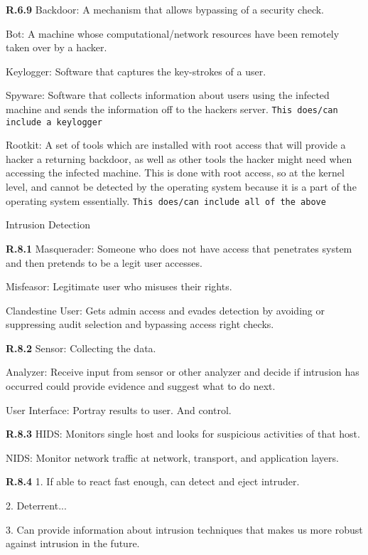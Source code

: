 \documentclass[8pt]{extreport}
\begin{document}
{\bf R.6.9} 
Backdoor: A mechanism that allows bypassing of a security check.

Bot: A machine whose computational/network resources have been remotely taken
over by a hacker.

Keylogger: Software that captures the key-strokes of a user. 

Spyware: Software that collects information about users using the infected
machine and sends the information off to the hackers server. \texttt{This
does/can include a keylogger}

Rootkit: A set of tools which are installed with root access that will provide a
hacker a returning backdoor, as well as other tools the hacker might need when
accessing the infected machine. This is done with root access, so at the kernel
level, and cannot be detected by the operating system because it is a part of
the operating system essentially. \texttt{This does/can include all of the above}



{\Huge Intrusion Detection}

{\bf R.8.1}
Masquerader: Someone who does not have access that penetrates system and then
pretends to be a legit user accesses.

Misfeasor: Legitimate user who misuses their rights.

Clandestine User: Gets admin access and evades detection by avoiding or
suppressing audit selection and bypassing access right checks.


{\bf R.8.2}
Sensor: Collecting the data.

Analyzer: Receive input from sensor or other analyzer and decide if intrusion
has occurred could provide evidence and suggest what to do next.

User Interface: Portray results to user. And control.

{\bf R.8.3}
HIDS: Monitors single host and looks for suspicious activities of that host.

NIDS: Monitor network traffic at network, transport, and application layers.

{\bf R.8.4}
1. If able to react fast enough, can detect and eject intruder.

2. Deterrent...

3. Can provide information about intrusion techniques that makes us more robust
against intrusion in the future.

\end{document}
